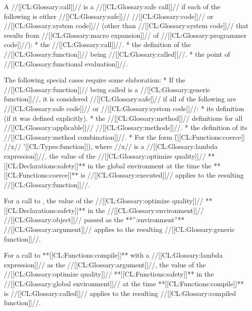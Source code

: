 



 

A //[[CL:Glossary:call]]// is a //[[CL:Glossary:safe call]]// if each of the following is either //[[CL:Glossary:safe]]// //[[CL:Glossary:code]]// or //[[CL:Glossary:system code]]// (other than //[[CL:Glossary:system code]]// that results from //[[CL:Glossary:macro expansion]]// of  //[[CL:Glossary:programmer code]]//): 
  *  the //[[CL:Glossary:call]]//. 
  * the definition of the //[[CL:Glossary:function]]// being //[[CL:Glossary:called]]//. 
  * the point of //[[CL:Glossary:functional evaluation]]//.

The following special cases require some elaboration:
  * If the //[[CL:Glossary:function]]// being called is a //[[CL:Glossary:generic function]]//, it is considered //[[CL:Glossary:safe]]// if all of the following are //[[CL:Glossary:safe code]]// or //[[CL:Glossary:system code]]//: 
    * its definition (if it was defined explicitly). 
    * the //[[CL:Glossary:method]]// definitions for all //[[CL:Glossary:applicable]]// //[[CL:Glossary:methods]]//. 
    * the definition of its //[[CL:Glossary:method combination]]//.
  * For the form \f{([[CL:Functions:coerce]] //x// '[[CL:Types:function]])},  where //x// is a //[[CL:Glossary:lambda expression]]//, the value of the //[[CL:Glossary:optimize quality]]// **[[CL:Declarations:safety]]** in the global environment at the time the **[[CL:Functions:coerce]]** is //[[CL:Glossary:executed]]// applies to the resulting //[[CL:Glossary:function]]//.


    \itemitem{\bull} For a call to , the value of the //[[CL:Glossary:optimize quality]]// **[[CL:Declarations:safety]]** in the //[[CL:Glossary:environment]]// //[[CL:Glossary:object]]// passed as the **'':environment''** //[[CL:Glossary:argument]]// applies  to the resulting //[[CL:Glossary:generic function]]//.

\itemitem{\bull} For a call to **[[CL:Functions:compile]]** with a //[[CL:Glossary:lambda expression]]// as the //[[CL:Glossary:argument]]//, the value of the //[[CL:Glossary:optimize quality]]// **[[CL:Functions:safety]]** in the //[[CL:Glossary:global environment]]// at the time **[[CL:Functions:compile]]** is //[[CL:Glossary:called]]// applies to the resulting //[[CL:Glossary:compiled function]]//.

